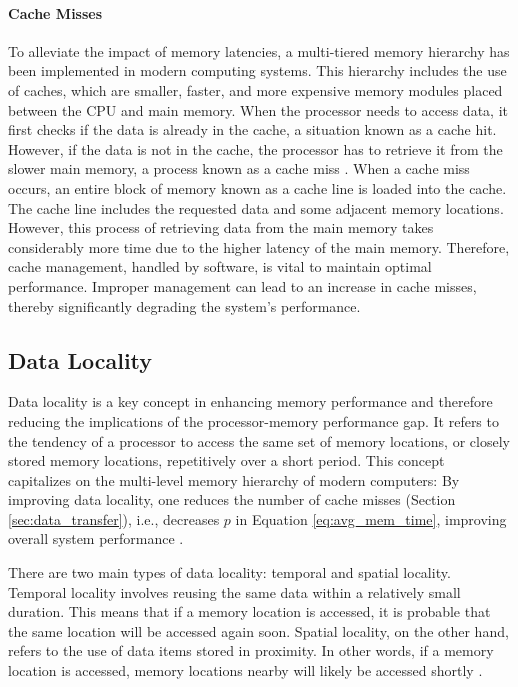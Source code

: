 \paragraph*{Cache Misses}\label{sec:cache_misses} To alleviate the impact of memory latencies, a multi-tiered memory hierarchy has been implemented in modern computing systems. This hierarchy includes the use of caches, which are smaller, faster, and more expensive memory modules placed between the CPU and main memory. When the processor needs to access data, it first checks if the data is already in the cache, a situation known as a cache hit. However, if the data is not in the cache, the processor has to retrieve it from the slower main memory, a process known as a cache miss \cite{efnusheva2017survey, mahapatra1999processor, machanick2002approaches}. When a cache miss occurs, an entire block of memory known as a cache line is loaded into the cache. The cache line includes the requested data and some adjacent memory locations. However, this process of retrieving data from the main memory takes considerably more time due to the higher latency of the main memory. Therefore, cache management, handled by software, is vital to maintain optimal performance. Improper management can lead to an increase in cache misses, thereby significantly degrading the system's performance.

\subsection{Data Locality}\label{sec:data_locality}
Data locality is a key concept in enhancing memory performance and therefore reducing the implications of the processor-memory performance gap. It refers to the tendency of a processor to access the same set of memory locations, or closely stored memory locations, repetitively over a short period. This concept capitalizes on the multi-level memory hierarchy of modern computers: By improving data locality, one reduces the number of cache misses (Section \ref{sec:data_transfer}), i.e., decreases $p$ in Equation \ref{eq:avg_mem_time}, improving overall system performance \cite{unat2017trends, tate2014programming}.

There are two main types of data locality: temporal and spatial locality. Temporal locality involves reusing the same data within a relatively small duration. This means that if a memory location is accessed, it is probable that the same location will be accessed again soon. Spatial locality, on the other hand, refers to the use of data items stored in proximity. In other words, if a memory location is accessed, memory locations nearby will likely be accessed shortly \cite{esseghir1993improving}.

